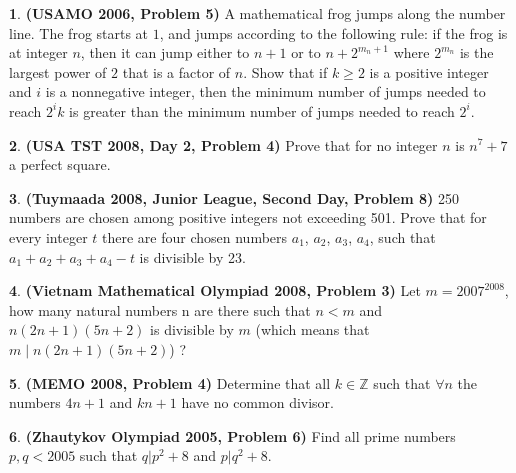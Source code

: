 \documentclass{article}
\newcommand{\plus}{+}
\newcommand{\minus}{-}
\newcommand{\equal}{=}
\theoremstyle{definition}
\newtheorem{p}{}
\begin{document}
\begin{p}{\bf (USAMO 2006, Problem 5)}
A mathematical frog jumps along the number line. The frog starts at $1$, and jumps according to the following rule: if the frog is at integer $n$, then it can jump either to $n+1$ or to $n + 2^{m_n+1}$ where $2^{m_n}$ is the largest power of $2$ that is a factor of $n.$ Show that if $k \geq 2$ is a positive integer and $i$ is a nonnegative integer, then the minimum number of jumps needed to reach $2^ik$ is greater than the minimum number of jumps needed to reach $2^i.$
\end{p}




\begin{p}{\bf (USA TST 2008, Day 2, Problem 4)}
Prove that for no integer $ n$ is $ n^7 \plus{} 7$ a perfect square.
\end{p}




\begin{p}{\bf (Tuymaada 2008, Junior League, Second Day, Problem 8)}
250 numbers are chosen among positive integers not exceeding 501. Prove that for every integer $ t$ there are four chosen numbers $ a_1$, $ a_2$, $ a_3$, $ a_4$, such that $ a_1 \plus{} a_2 \plus{} a_3 \plus{} a_4 \minus{} t$ is divisible by 23.
\end{p}













\begin{p}{\bf (Vietnam Mathematical Olympiad 2008, Problem 3)}
Let $ m \equal{} 2007^{2008}$, how many natural numbers n are there such that $ n < m$ and $ n(2n \plus{} 1)(5n \plus{} 2)$ is divisible by $ m$ (which means that $ m \mid n(2n \plus{} 1)(5n \plus{} 2)$) ?
\end{p}







\begin{p}{\bf (MEMO 2008, Problem 4)}
Determine that all $ k \in \mathbb{Z}$ such that $ \forall n$ the numbers $ 4n\plus{}1$ and $ kn\plus{}1$ have no common divisor.
\end{p}





\begin{p}{\bf (Zhautykov Olympiad 2005, Problem 6)}
Find all prime numbers $ p,q < 2005$ such that $ q | p^{2} \plus{} 8$  and $ p|q^{2} \plus{} 8.$
\end{p}
\end{document}

